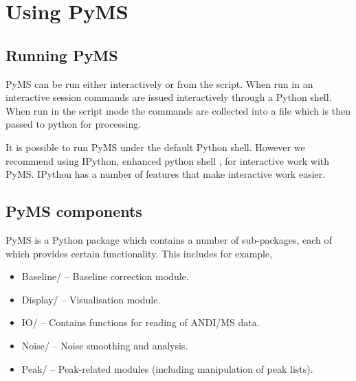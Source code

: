 

\chapter{Using PyMS}

\section{Running PyMS}

PyMS can be run either interactively or from the script. When run
in an interactive session commands are issued interactively through
a Python shell. When run in the script mode the commands are collected
into a file which is then passed to python for processing.

It is possible to run PyMS under the default Python shell. However
we recommend using IPython, enhanced python shell \cite{ipython},
for interactive work with PyMS. IPython has a number of features
that make interactive work easier.

\section{PyMS components}

PyMS is a Python package which contains a number of sub-packages,
each of which provides certain functionality. This includes for
example, 

\begin{itemize}
\item Baseline/ -- Baseline correction module.
\item Display/ -- Visualisation module.
\item IO/ -- Contains functions for reading of ANDI/MS data.
\item Noise/ -- Noise smoothing and analysis.
\item Peak/ -- Peak-related modules (including manipulation of peak
lists).
\end{itemize}

